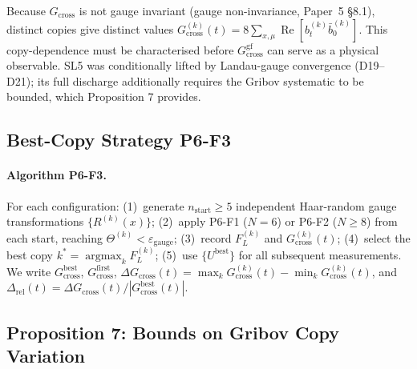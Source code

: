 \documentclass[11pt,a4paper]{article}
\theoremstyle{plain}
\theoremstyle{definition}
\theoremstyle{remark}
\renewcommand{\Re}{\operatorname{Re}}
\newcommand{\Gcross}{G_{\mathrm{cross}}}
\newcommand{\Gcrossgf}{G_{\mathrm{cross}}^{\mathrm{gf}}}
\newcommand{\epsg}{\varepsilon_{\mathrm{gauge}}}
\newcommand{\FL}{F_{L}}
\begin{document}
Because $\Gcross$ is not gauge invariant (gauge non-invariance, Paper~5 \S8.1),
distinct copies give distinct values
$\Gcross^{(k)}(t)=8\sum_{x,\mu}\Re[b^{(k)}_t\bar b^{(k)}_0]$. This
copy-dependence must be characterised before $\Gcrossgf$ can serve as a
physical observable. SL5 was conditionally lifted by Landau-gauge
convergence (D19--D21); its full discharge additionally requires the
Gribov systematic to be bounded, which Proposition 7 provides.

\subsection{Best-Copy Strategy P6-F3}
\label{ssec:F3}

\paragraph{Algorithm P6-F3.}
For each configuration: (1)~generate $n_{\mathrm{start}}\ge5$
independent Haar-random gauge transformations $\{R^{(k)}(x)\}$;
(2)~apply P6-F1 ($N=6$) or P6-F2 ($N\ge8$) from each start, reaching
$\Theta^{(k)}<\epsg$; (3)~record $\FL^{(k)}$ and $\Gcross^{(k)}(t)$;
(4)~select the best copy $k^{*}=\operatorname{argmax}_k\FL^{(k)}$;
(5)~use $\{U^{\mathrm{best}}\}$ for all subsequent measurements. We
write $\Gcross^{\mathrm{best}}$, $\Gcross^{\mathrm{first}}$,
$\Delta\Gcross(t)=\max_k\Gcross^{(k)}(t)-\min_k\Gcross^{(k)}(t)$, and
$\Delta_{\mathrm{rel}}(t)=\Delta\Gcross(t)/|\Gcross^{\mathrm{best}}(t)|$.

\subsection{Proposition 7: Bounds on Gribov Copy Variation}
\label{ssec:prop7}
\end{document}
